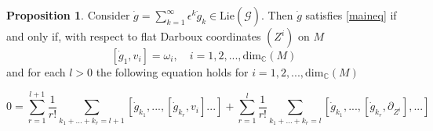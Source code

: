\documentclass{article}
\theoremstyle{definition}
\newtheorem{proposition}[theorem]{Proposition}
\numberwithin{equation}{section}
\begin{document}
\begin{proposition}\label{geq}
    Consider $\dot{g}=\sum_{k=1}^{\infty}\epsilon^k\dot{g}_k\in \text{Lie}(\widehat{\mathcal{G}})$. Then $\dot{g}$ satisfies \eqref{maineq} if and only if, with respect to flat Darboux coordinates $(Z^i)$ on $M$
    \begin{equation}\label{firstrec}
    [\dot{g}_1,v_i]=\omega_i, \quad i=1,2,...,\text{dim}_{\mathbb{C}}(M)
\end{equation}
and for each $l>0$ the following equation holds for $i=1,2,...,\text{dim}_{\mathbb{C}}(M)$

\begin{equation}\label{receq}
0=\sum_{r=1}^{l+1}\frac{1}{r!}\sum_{k_1+...+k_r=l+1}[\dot{g}_{k_1},...,[\dot{g}_{k_r},v_i]...] + \sum_{r=1}^{l}\frac{1}{r!}\sum_{k_1+...+k_r=l}[\dot{g}_{k_1},...,[\dot{g}_{k_r},\partial_{Z^i}],...]    
\end{equation}

\end{proposition}
\end{document}
